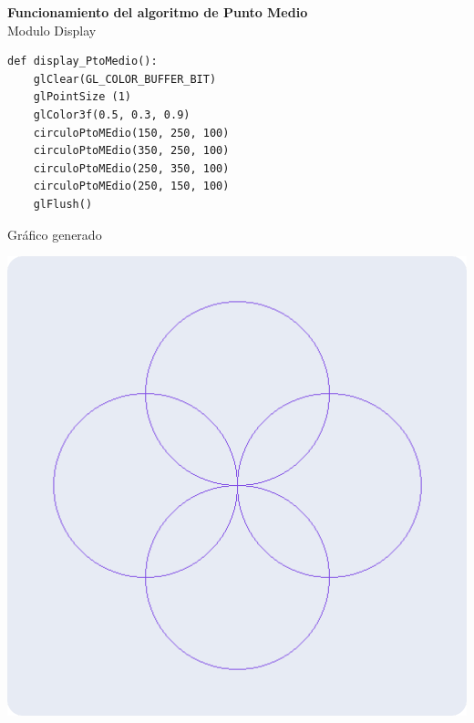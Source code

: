 \documentclass[a4paper]{article}
\begin{document}
\Large{\textbf{Funcionamiento del algoritmo de Punto Medio}}\\[0.5cm]
Modulo Display 
\begin{center}
\begin{mycodebox}
\begin{lstlisting}
def display_PtoMedio():
    glClear(GL_COLOR_BUFFER_BIT)
    glPointSize (1)
    glColor3f(0.5, 0.3, 0.9) 
    circuloPtoMEdio(150, 250, 100)
    circuloPtoMEdio(350, 250, 100)
    circuloPtoMEdio(250, 350, 100)
    circuloPtoMEdio(250, 150, 100)
    glFlush()
\end{lstlisting}
\end{mycodebox}
\end{center}
Gráfico generado
\begin{center}
\includegraphics[width=15cm]{src/ProMedioCir.png}\\
\end{center}
\newpage
\end{document}
